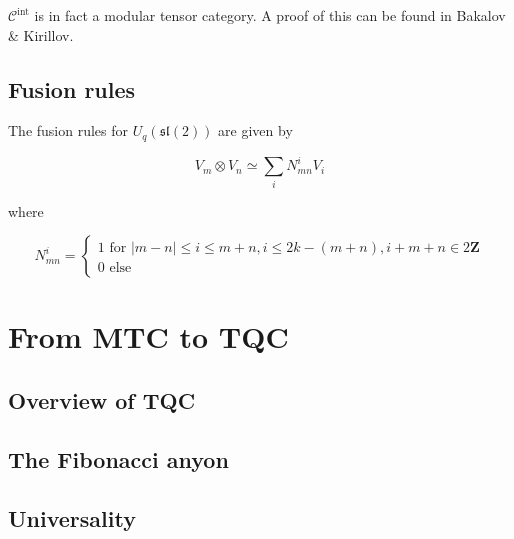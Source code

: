 \documentclass[]{article}
\newcommand{\sll}{\mathfrak{sl}}
\numberwithin{equation}{subsection}
\begin{document}
$\mathcal{C}^\text{int}$ is in fact a modular tensor category. A proof of this
can be found in Bakalov \& Kirillov. %
 
\subsection{Fusion rules}

The fusion rules for $U_q(\sll(2))$ are given by 

\begin{equation}
    V_m \otimes V_n \simeq \sum_i N_{mn}^i V_i
\end{equation}

where 

\begin{equation}
    N_{mn}^i = \begin{cases} 1 \text{ for } |m-n| \leq i \leq m+n, i \leq 2k - (m+n), i + m + n \in 2 \mathbf{Z} \\
                             0 \text{ else } 
               \end{cases}
\end{equation}


\section{From MTC to TQC}
\subsection{Overview of TQC}
\subsection{The Fibonacci anyon}
\subsection{Universality}



\end{document}
